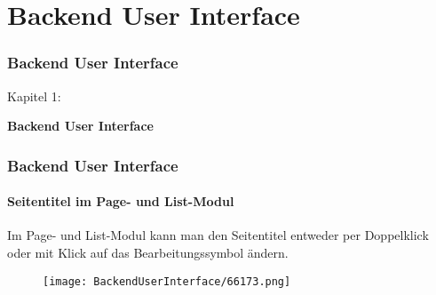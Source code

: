 %

\section{Backend User Interface}
\begin{frame}[fragile]
	\frametitle{Backend User Interface}

	\begin{center}\huge{Kapitel 1:}\end{center}
	\begin{center}\huge{\color{typo3darkgrey}\textbf{Backend User Interface}}\end{center}

\end{frame}

\begin{frame}[fragile]
	\frametitle{Backend User Interface}
	\framesubtitle{Seitentitel im Page- und List-Modul}

	Im Page- und List-Modul kann man den Seitentitel entweder per Doppelklick
	oder mit Klick auf das Bearbeitungssymbol ändern.

	\begin{figure}
		\texttt{[image: BackendUserInterface/66173.png]}
	\end{figure}

\end{frame}

